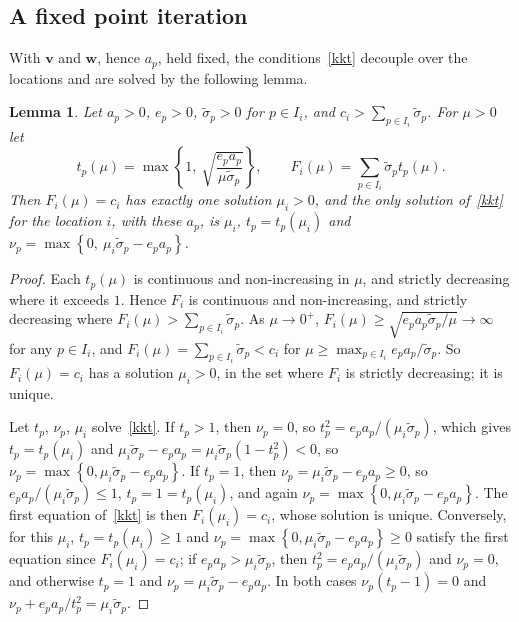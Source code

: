 \documentclass[11pt]{article}
\theoremstyle{plain}
\newtheorem{lemma}[theorem]{Lemma}
\theoremstyle{remark}
\numberwithin{equation}{section}
\begin{document}
\subsection{A fixed point iteration}\label{sec-fixed-point}

With $\bm v$ and $\bm w$, hence $a_p$, held fixed, the conditions~\eqref{kkt}
decouple over the locations and are solved by the following lemma.

\begin{lemma}\label{frozen}
Let $a_p>0$, $e_p>0$, $\widetilde\sigma_p>0$ for $p\in I_i$, and
$c_i>\sum_{p\in I_i}\widetilde\sigma_p$. For $\mu>0$ let
\begin{equation}\label{t-of-mu}
t_p(\mu)=\max\left\{1,\ \sqrt{\frac{e_pa_p}{\mu\widetilde\sigma_p}}\right\},
\qquad F_i(\mu)=\sum_{p\in I_i}\widetilde\sigma_pt_p(\mu).
\end{equation}
Then $F_i(\mu)=c_i$ has exactly one solution $\mu_i>0$, and the only
solution of~\eqref{kkt} for the location $i$, with these $a_p$, is $\mu_i$,
$t_p=t_p(\mu_i)$ and $\nu_p=\max\left\{0,\ \mu_i\widetilde\sigma_p-e_pa_p\right\}$.
\end{lemma}
\begin{proof}
Each $t_p(\mu)$ is continuous and non-increasing in $\mu$, and strictly
decreasing where it exceeds $1$. Hence $F_i$ is continuous and
non-increasing, and strictly decreasing where
$F_i(\mu)>\sum_{p\in I_i}\widetilde\sigma_p$. As $\mu\to 0^+$,
$F_i(\mu)\ge\sqrt{e_pa_p\widetilde\sigma_p/\mu}\to\infty$ for any
$p\in I_i$, and $F_i(\mu)=\sum_{p\in I_i}\widetilde\sigma_p<c_i$ for
$\mu\ge\max_{p\in I_i}e_pa_p/\widetilde\sigma_p$. So $F_i(\mu)=c_i$ has a
solution $\mu_i>0$, in the set where $F_i$ is strictly decreasing; it is
unique.

Let $t_p$, $\nu_p$, $\mu_i$ solve~\eqref{kkt}. If $t_p>1$, then $\nu_p=0$, so
$t_p^2=e_pa_p/(\mu_i\widetilde\sigma_p)$, which gives $t_p=t_p(\mu_i)$ and
$\mu_i\widetilde\sigma_p-e_pa_p=\mu_i\widetilde\sigma_p\left(1-t_p^2\right)<0$,
so $\nu_p=\max\left\{0,\mu_i\widetilde\sigma_p-e_pa_p\right\}$. If $t_p=1$,
then $\nu_p=\mu_i\widetilde\sigma_p-e_pa_p\ge 0$, so
$e_pa_p/(\mu_i\widetilde\sigma_p)\le 1$, $t_p=1=t_p(\mu_i)$, and again
$\nu_p=\max\left\{0,\mu_i\widetilde\sigma_p-e_pa_p\right\}$. The first
equation of~\eqref{kkt} is then $F_i(\mu_i)=c_i$, whose solution is unique.
Conversely, for this $\mu_i$, $t_p=t_p(\mu_i)\ge 1$ and
$\nu_p=\max\left\{0,\mu_i\widetilde\sigma_p-e_pa_p\right\}\ge 0$ satisfy the
first equation since $F_i(\mu_i)=c_i$; if $e_pa_p>\mu_i\widetilde\sigma_p$,
then $t_p^2=e_pa_p/(\mu_i\widetilde\sigma_p)$ and $\nu_p=0$, and otherwise
$t_p=1$ and $\nu_p=\mu_i\widetilde\sigma_p-e_pa_p$. In both cases
$\nu_p(t_p-1)=0$ and $\nu_p+e_pa_p/t_p^2=\mu_i\widetilde\sigma_p$.
\end{proof}
\end{document}
